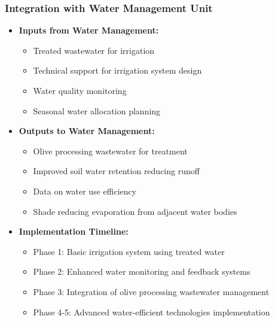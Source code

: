 \subsubsection{Integration with Water Management Unit}
\begin{itemize}
    \item \textbf{Inputs from Water Management:}
    \begin{itemize}
        \item Treated wastewater for irrigation
        \item Technical support for irrigation system design
        \item Water quality monitoring
        \item Seasonal water allocation planning
    \end{itemize}
    
    \item \textbf{Outputs to Water Management:}
    \begin{itemize}
        \item Olive processing wastewater for treatment
        \item Improved soil water retention reducing runoff
        \item Data on water use efficiency
        \item Shade reducing evaporation from adjacent water bodies
    \end{itemize}
    
    \item \textbf{Implementation Timeline:}
    \begin{itemize}
        \item Phase 1: Basic irrigation system using treated water
        \item Phase 2: Enhanced water monitoring and feedback systems
        \item Phase 3: Integration of olive processing wastewater management
        \item Phase 4-5: Advanced water-efficient technologies implementation
    \end{itemize}
\end{itemize}

